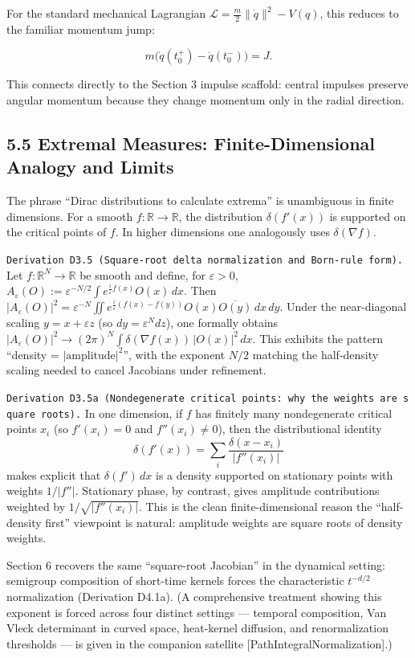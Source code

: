 \documentclass[
]{article}
\begin{document}
For the standard mechanical Lagrangian
\(\mathcal L=\frac{m}{2}\|\dot q\|^2-V(q)\), this reduces to the
familiar momentum jump:

\[
m\big(\dot q(t_0^+)-\dot q(t_0^-)\big)=J.
\]

This connects directly to the Section 3 impulse scaffold: central
impulses preserve angular momentum because they change momentum only in
the radial direction.

\subsection{5.5 Extremal Measures: Finite-Dimensional Analogy and
Limits}\label{extremal-measures-finite-dimensional-analogy-and-limits}

The phrase ``Dirac distributions to calculate extrema'' is unambiguous
in finite dimensions. For a smooth \(f:\mathbb R\to\mathbb R\), the
distribution \(\delta(f'(x))\) is supported on the critical points of
\(f\). In higher dimensions one analogously uses \(\delta(\nabla f)\).

\texttt{Derivation\ D3.5\ (Square-root\ delta\ normalization\ and\ Born-rule\ form).}
Let \(f:\mathbb R^N\to\mathbb R\) be smooth and define, for
\(\varepsilon>0\),
\(A_\varepsilon(O):=\varepsilon^{-N/2}\int e^{\frac{i}{\varepsilon}f(x)}O(x)\,dx\).
Then
\(|A_\varepsilon(O)|^2=\varepsilon^{-N}\iint e^{\frac{i}{\varepsilon}(f(x)-f(y))}O(x)\overline{O(y)}\,dx\,dy\).
Under the near-diagonal scaling \(y=x+\varepsilon z\) (so
\(dy=\varepsilon^Ndz\)), one formally obtains
\(|A_\varepsilon(O)|^2\to (2\pi)^N\int \delta(\nabla f(x))\,|O(x)|^2\,dx\).
This exhibits the pattern ``density = \(|\text{amplitude}|^2\)'', with
the exponent \(N/2\) matching the half-density scaling needed to cancel
Jacobians under refinement.

\texttt{Derivation\ D3.5a\ (Nondegenerate\ critical\ points:\ why\ the\ weights\ are\ square\ roots).}
In one dimension, if \(f\) has finitely many nondegenerate critical
points \(x_i\) (so \(f'(x_i)=0\) and \(f''(x_i)\neq 0\)), then the
distributional identity \[
\delta(f'(x))=\sum_i \frac{\delta(x-x_i)}{|f''(x_i)|}
\] makes explicit that \(\delta(f')\,dx\) is a density supported on
stationary points with weights \(1/|f''|\). Stationary phase, by
contrast, gives amplitude contributions weighted by
\(1/\sqrt{|f''(x_i)|}\). This is the clean finite-dimensional reason the
``half-density first'' viewpoint is natural: amplitude weights are
square roots of density weights.

Section 6 recovers the same ``square-root Jacobian'' in the dynamical
setting: semigroup composition of short-time kernels forces the
characteristic \(t^{-d/2}\) normalization (Derivation D4.1a). (A
comprehensive treatment showing this exponent is forced across four
distinct settings --- temporal composition, Van Vleck determinant in
curved space, heat-kernel diffusion, and renormalization thresholds ---
is given in the companion satellite {[}PathIntegralNormalization{]}.)
\end{document}
